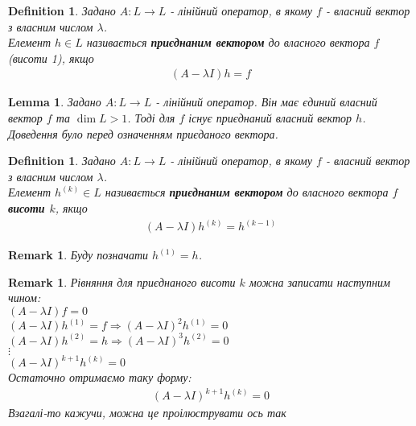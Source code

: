 \documentclass[a4paper, 10pt]{article}
\theoremstyle{theoremdd}
\newtheorem{definition}[theorem]{Definition}
\newtheorem{remark}[theorem]{Remark}
\newtheorem{lemma}[theorem]{Lemma}
\begin{document}
\begin{definition}
Задано $A: L \to L$ - лінійний оператор, в якому $f$ - власний вектор з власним числом $\lambda$.\\
Елемент $h \in L$ називається \textbf{приєднаним вектором} до власного вектора $f$ (висоти 1), якщо
\begin{align*}
(A-\lambda I)h = f
\end{align*}
\end{definition}

\begin{lemma}
Задано $A: L \to L$ - лінійний оператор. Він має єдиний власний вектор $f$ та $\dim L > 1$. Тоді для $f$ існує приєднаний власний вектор $h$.\\
\textit{Доведення було перед означенням приєданого вектора.}
\end{lemma}

\begin{definition}
Задано $A: L \to L$ - лінійний оператор, в якому $f$ - власний вектор з власним числом $\lambda$.\\
Елемент $h^{(k)} \in L$ називається \textbf{приєднаним вектором} до власного вектора $f$ \textbf{висоти $k$}, якщо
\begin{align*}
(A-\lambda I)h^{(k)} = h^{(k-1)}
\end{align*}
\end{definition}

\begin{remark}
Буду позначати $h^{(1)} = h$.
\end{remark}

\begin{remark}
Рівняння для приєднаного висоти $k$ можна записати наступним чином:\\
$(A-\lambda I)f = 0$\\
$(A-\lambda I)h^{(1)} = f \Rightarrow (A-\lambda I)^2 h^{(1)} = 0$\\
$(A-\lambda I)h^{(2)} = h \Rightarrow (A-\lambda I)^3 h^{(2)} = 0$\\
$\vdots$\\
$(A-\lambda I)^{k+1}h^{(k)} = 0$\\
Остаточно отримаємо таку форму:
\begin{align*}
(A-\lambda I)^{k+1}h^{(k)} = 0
\end{align*}
Взагалі-то кажучи, можна це проілюструвати ось так
\begin{figure}[H]
\centering
{}
\end{figure}
\end{remark}
\end{document}
